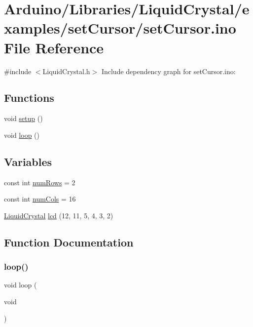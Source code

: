 \hypertarget{set_cursor_8ino}{}\section{Arduino/\+Libraries/\+Liquid\+Crystal/examples/set\+Cursor/set\+Cursor.ino File Reference}
\label{set_cursor_8ino}
{\ttfamily \#include $<$Liquid\+Crystal.\+h$>$}\newline
Include dependency graph for set\+Cursor.\+ino\+:
\subsection*{Functions}
\begin{DoxyCompactItemize}
\item 
void \hyperlink{set_cursor_8ino_a4fc01d736fe50cf5b977f755b675f11d}{setup} ()
\item 
void \hyperlink{set_cursor_8ino_afe461d27b9c48d5921c00d521181f12f}{loop} ()
\end{DoxyCompactItemize}
\subsection*{Variables}
\begin{DoxyCompactItemize}
\item 
const int \hyperlink{set_cursor_8ino_a0a71c7688574037878da0a5eb0bdf67f}{num\+Rows} = 2
\item 
const int \hyperlink{set_cursor_8ino_a68316f18cb2073c5ed74f5e59f848152}{num\+Cols} = 16
\item 
\hyperlink{class_liquid_crystal}{Liquid\+Crystal} \hyperlink{set_cursor_8ino_a7226623e632d4109904c86009c9f3b60}{lcd} (12, 11, 5, 4, 3, 2)
\end{DoxyCompactItemize}


\subsection{Function Documentation}
\mbox{\label{set_cursor_8ino_afe461d27b9c48d5921c00d521181f12f}} 
\subsubsection{\texorpdfstring{loop()}{loop()}}
{\footnotesize\ttfamily void loop (\begin{DoxyParamCaption}\item[{void}]{ }\end{DoxyParamCaption})}

